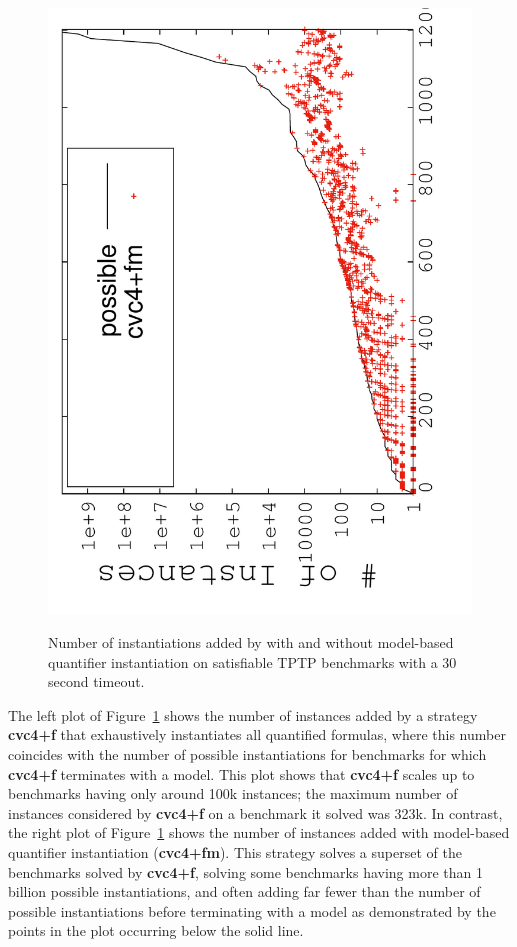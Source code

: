 \documentclass[oribibl]{llncs}
\begin{document}
\begin{figure}[t]
{\includegraphics[scale=.22, angle=270]{model-size-mbqi.pdf} 
}%
\caption{
Number of instantiations added by \cvc with and without model-based quantifier instantiation
on satisfiable TPTP benchmarks with a 30 second timeout.
}
\label{fig:inst-mbqi}
\end{figure}

The left plot of Figure~\ref{fig:inst-mbqi} shows the number of instances
added by a strategy {\bf cvc4+f} that exhaustively instantiates all quantified formulas,
where this number coincides with the number of possible instantiations for benchmarks for which
{\bf cvc4+f} terminates with a model.
This plot shows that {\bf cvc4+f} scales up to benchmarks having only around 100k instances;
the maximum number of instances considered by {\bf cvc4+f} on a benchmark it solved was 323k.
In contrast, the right plot of Figure~\ref{fig:inst-mbqi} shows the number of instances
added with model-based quantifier instantiation ({\bf cvc4+fm}).
This strategy solves a superset of the benchmarks solved by {\bf cvc4+f},
solving some benchmarks having more than 1 billion possible instantiations,
and often adding far fewer than the number of possible instantiations before terminating with a model
as demonstrated by the points in the plot occurring below the solid line.
\end{document}
